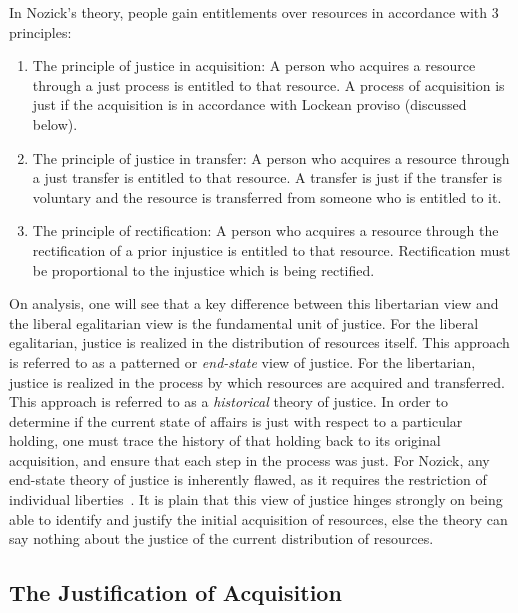 In Nozick's theory, people gain entitlements over resources in accordance with
3 principles:
\begin{enumerate}
    \item The principle of justice in acquisition: A person who acquires a
          resource through a just process is entitled to that resource.
          A process of acquisition is just if the acquisition is in accordance
          with Lockean proviso (discussed below).
    \item The principle of justice in transfer: A person who acquires a resource
          through a just transfer is entitled to that resource. A transfer is 
          just if the transfer is voluntary and the resource is transferred
          from someone who is entitled to it.
    \item The principle of rectification: A person who acquires a resource
          through the rectification of a prior injustice is entitled to that
          resource. Rectification must be proportional to the injustice which
          is being rectified.
\end{enumerate}

On analysis, one will see that a key difference between this libertarian view
and the liberal egalitarian view is the fundamental unit of justice. For the 
liberal egalitarian, justice is realized in the distribution of resources
itself. This approach is referred to as a patterned or \textit{end-state} view of justice.
For the libertarian, justice is realized in the process by which resources are
acquired and transferred. This approach is referred to as a \textit{historical} theory of
justice. In order to determine if the current state of affairs is just with 
respect to a particular holding, one must trace the history of that holding
back to its original acquisition, and ensure that each step in the process was
just. For Nozick, any end-state theory of justice is inherently flawed, as it 
requires the restriction of individual liberties~\citep{Henberg_1977}. It is
plain that this view of justice hinges strongly on being able to identify and
justify the initial acquisition of resources, else the theory can say nothing 
about the justice of the current distribution of resources.

\subsection{The Justification of Acquisition}

